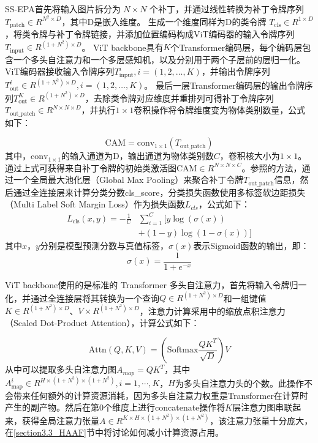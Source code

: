 SS-EPA首先将输入图片拆分为 $N\times N$ 个补丁，并通过线性转换为补丁令牌序列 $T_{\text{patch}}\in R^{N^2\times D}$，其中D是嵌入维度。
生成一个维度同样为D的类令牌 $T_{\text{cls}}\in R^{1\times D}$，将类令牌与补丁令牌链接，并添加位置编码构成ViT编码器的输入令牌序列 $T_{\text{input}}\in R^{(1+N^2)\times D}$。
ViT backbone具有$K$个Transformer编码层，每个编码层包含一个多头自注意力和一个多层感知机，以及分别用于两个子层前的层归一化。
ViT编码器接收输入令牌序列$T_{\text{input}}^i,i=(1,2,…,K)$，并输出令牌序列$T_{\text{out}}^i\in R^{(1+N^2)\times D},i=(1,2,…,K)$。
最后一层Transformer编码层的输出令牌序列$T_{\text{out}}^K\in R^{(1+N^2)\times D}$，去除类令牌对应维度并重排列可得补丁令牌序列$T_{\text{out\_patch}}\in R^{N\times N\times D}$，并执行$1\times 1$卷积操作将令牌维度变为物体类别数量，公式如下：

\begin{equation}
    \text{CAM}=\text{conv}_{1\times 1} (T_\text{out\_patch})
\end{equation}
其中，$\text{conv}_{1\times 1}$的输入通道为D，输出通道为物体类别数$C$，卷积核大小为$1\times 1$。通过上式可获得来自补丁令牌的初始类激活图$\text{CAM}\in R^{N\times N\times C}$。参照\cite{13ru2022learning}的方法，通过一个全局最大池化层（Global Max Pooling）来聚合补丁令牌$T_{\text{out\_patch}}$信息，然后通过全连接层来计算分类分数cls\_score，分类损失函数使用多标签软边距损失（Multi Label Soft Margin Loss）作为损失函数$L_{cls}$，公式如下：
\begin{equation}
    \begin{aligned}
        L_\text{cls}(x,y) = - \frac{1}{C}&\sum_{i=1}^C [y\log(\sigma (x)) \\
        &+(1-y)\log(1-\sigma (x))]
    \end{aligned}
\end{equation}
其中$x$，$y$分别是模型预测分数与真值标签，$\sigma(x)$表示Sigmoid函数的输出，即：
\begin{equation}
    \sigma(x) = \frac{1}{1+e^{-x}}
\end{equation}

ViT backbone使用的是标准的 Transformer 多头自注意力，首先将输入令牌归一化，并通过全连接层将其转换为一个查询$Q\in R^{(1+N^2)\times D}$和一组键值$K\in R^{(1+N^2)\times D}$、$V\times R^{(1+N^2)\times D}$，注意力计算采用\cite{14vaswani2017attention}中的缩放点积注意力（Scaled Dot-Product Attention），计算公式如下：

\begin{equation}
    \text{Attn}(Q,K,V)=\left(\text{Softmax}\frac{QK^T}{\sqrt{D}}\right)V
\end{equation}
从中可以提取多头自注意力图$A_{map}=QK^T$，其中$A_{\text{map}}^i\in R^{H\times (1+N^2)\times (1+N^2)} ,i=1,\cdots,K$，$H$为多头自注意力头的个数。此操作不会带来任何额外的计算资源消耗，因为多头自注意力权重是Transformer在计算时产生的副产物。然后在第$0$个维度上进行concatenate操作将$K$层注意力图串联起来，获得全局注意力张量$A\in R^{K\times H\times (1+N^2)\times (1+N^2)}$，该注意力张量十分庞大，在\ref{section3.3_HAAF}节中将讨论如何减小计算资源占用。

